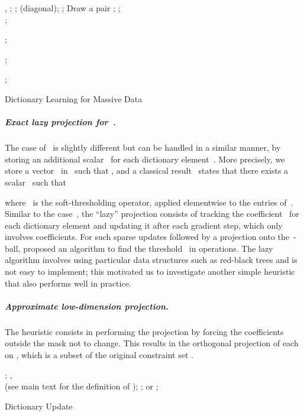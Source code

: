 \documentclass{article}
\begin{document}
\begin{algorithm}[t]
\begin{algorithmic}
    \REQUIRE {} ,
    \; 
    \STATE ; \qquad ;
    \STATE  (diagonal); \qquad ;
    \REPEAT
    \STATE Draw a pair ;
    \STATE ; \\

        \STATE ;

        \STATE ;

        \STATE ;

        \STATE ;

    \UNTIL{}

    \ENSURE 
\end{algorithmic}
\caption{Dictionary Learning for Massive Data}
\label{alg:dl}
\end{algorithm}

\subparagraph{Exact lazy projection for~.}
The case of~ is slightly different but can be handled in a similar
manner, by storing an additional scalar~ for each dictionary element~.
More precisely, we store a vector~ in~ such that ,
and a classical result~\citep[see][]{duchi_efficient_2008} states that there
exists a scalar~ such that

where~ is the soft-thresholding operator, applied elementwise to the entries of~.
Similar to the case~, the ``lazy'' projection consists of tracking the
coefficient~ for each dictionary element and updating it after each
gradient step, which only involves  coefficients.
For such sparse updates followed by a projection onto the~-ball,
\citet{duchi_efficient_2008} proposed an algorithm to find the
threshold~ in  operations.
The lazy algorithm involves using particular data structures such as red-black trees
and is not easy to implement; this motivated us to investigate another
simple heuristic that also performs well in practice.





\subparagraph{Approximate low-dimension projection.}
The heuristic consists in performing the projection by forcing the coefficients outside the mask not to change. This results in the orthogonal projection of each  on
, which is a subset of the original constraint set .


\begin{algorithm}[t]
\begin{algorithmic}
    \REQUIRE 
\FOR{}
    	\STATE ;
                \STATE ,\\
                (see main text for the definition of );
                \STATE ;
                \STATE or ;
		\ENDIF
    \ENDFOR
\end{algorithmic}
\caption{Dictionary Update}
\label{alg:dict_partial}
\end{algorithm}
\end{document}
